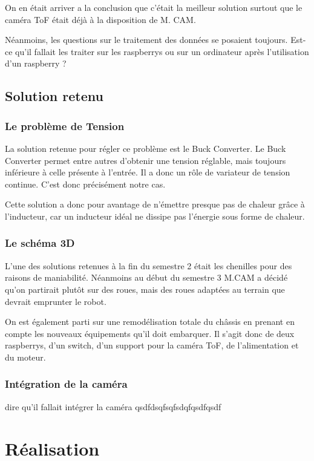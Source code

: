 \documentclass{PackagerQualityN}
\begin{document}
On en était arriver a la conclusion que c'était la meilleur solution surtout que le caméra ToF était déjà à la disposition de M. CAM.

Néanmoins, les questions sur le traitement des données se posaient toujours. Est-ce qu'il fallait les traiter sur les raspberrys ou sur un ordinateur après l’utilisation d’un raspberry ?   

\subsection{Solution retenu}

\subsubsection{Le problème de Tension}

La solution retenue pour régler ce problème est le Buck Converter. Le Buck Converter permet entre autres d’obtenir une tension réglable, mais toujours inférieure à celle présente à l’entrée. Il a donc un rôle de variateur de tension continue. C’est donc précisément notre cas.

Cette solution a donc pour avantage de n’émettre presque pas de chaleur grâce à l’inducteur, car un inducteur idéal ne dissipe pas l’énergie sous forme de chaleur.

\subsubsection{Le schéma 3D}

L’une des solutions retenues à la fin du semestre 2  était les chenilles pour des raisons de maniabilité. 
Néanmoins au début du semestre 3 M.CAM a décidé qu’on partirait plutôt sur des roues, mais des roues adaptées au terrain que devrait emprunter le robot.

On est également parti sur une remodélisation totale du châssis en prenant en compte les nouveaux équipements qu’il doit embarquer. Il s’agit donc de deux raspberrys, d’un switch, d’un support pour la caméra ToF, de l’alimentation et du moteur. 

\subsubsection{Intégration de la caméra}

dire qu'il fallait intégrer la caméra qsdfdsqfsqfsdqfqsdfqsdf

\section{Réalisation}
\end{document}

